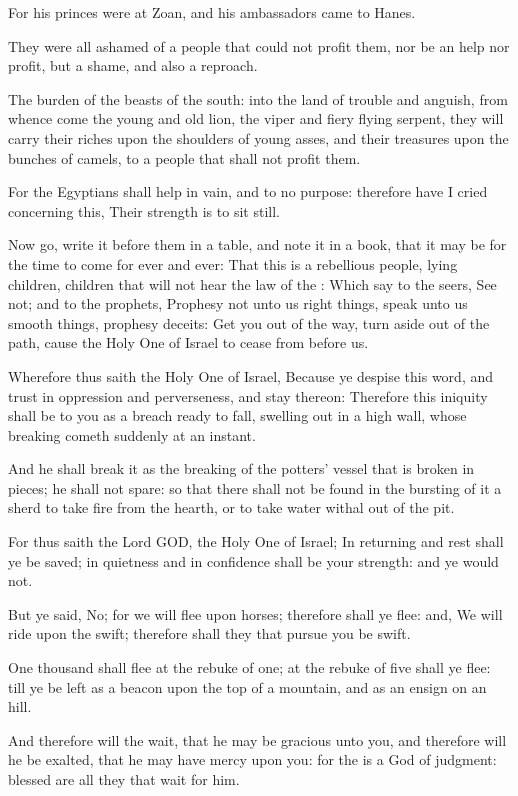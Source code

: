 \verse For his princes were at Zoan, and his ambassadors came to Hanes.

\verse They were all ashamed of a people that could not profit them, nor be an help nor profit, but a shame, and also a reproach.

\verse The burden of the beasts of the south: into the land of trouble and anguish, from whence come the young and old lion, the viper and fiery flying serpent, they will carry their riches upon the shoulders of young asses, and their treasures upon the bunches of camels, to a people that shall not profit them.

\verse For the Egyptians shall help in vain, and to no purpose: therefore have I cried concerning this, Their strength is to sit still.

\verse Now go, write it before them in a table, and note it in a book, that it may be for the time to come for ever and ever: \verse That this is a rebellious people, lying children, children that will not hear the law of the \LORD: \verse Which say to the seers, See not; and to the prophets, Prophesy not unto us right things, speak unto us smooth things, prophesy deceits: \verse Get you out of the way, turn aside out of the path, cause the Holy One of Israel to cease from before us.

\verse Wherefore thus saith the Holy One of Israel, Because ye despise this word, and trust in oppression and perverseness, and stay thereon: \verse Therefore this iniquity shall be to you as a breach ready to fall, swelling out in a high wall, whose breaking cometh suddenly at an instant.

\verse And he shall break it as the breaking of the potters' vessel that is broken in pieces; he shall not spare: so that there shall not be found in the bursting of it a sherd to take fire from the hearth, or to take water withal out of the pit.

\verse For thus saith the Lord GOD, the Holy One of Israel; In returning and rest shall ye be saved; in quietness and in confidence shall be your strength: and ye would not.

\verse But ye said, No; for we will flee upon horses; therefore shall ye flee: and, We will ride upon the swift; therefore shall they that pursue you be swift.

\verse One thousand shall flee at the rebuke of one; at the rebuke of five shall ye flee: till ye be left as a beacon upon the top of a mountain, and as an ensign on an hill.

\verse And therefore will the \LORD wait, that he may be gracious unto you, and therefore will he be exalted, that he may have mercy upon you: for the \LORD is a God of judgment: blessed are all they that wait for him.

